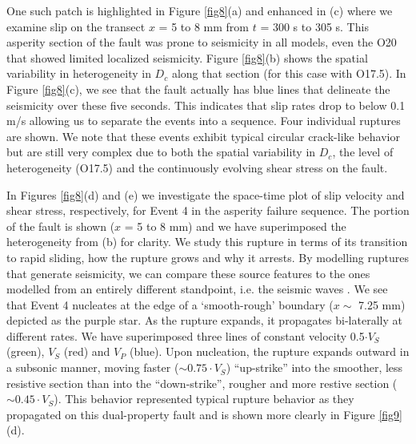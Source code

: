 \documentclass[draft]{agujournal2019}
\begin{document}
One such patch is highlighted in Figure \ref{fig8}(a) and enhanced in (c) where we examine slip on the transect $x$ = 5 to 8 mm from $t$ = 300 s to 305 s.  This asperity section of the fault was prone to seismicity in all models, even the O20 that showed limited localized seismicity. Figure \ref{fig8}(b) shows the spatial variability in heterogeneity in $D_{c}$ along that section (for this case with O17.5). In Figure \ref{fig8}(c), we see that the fault actually has blue lines that delineate the seismicity over these five seconds.  This indicates that slip rates drop to below 0.1 m/s allowing us to separate the events into a sequence.  Four individual ruptures are shown.  We note that these events exhibit typical circular crack-like behavior but are still very complex due to both the spatial variability in $D_{c}$, the level of heterogeneity (O17.5) and the continuously evolving shear stress on the fault.  

In Figures \ref{fig8}(d) and (e) we investigate the space-time plot of slip velocity and shear stress, respectively, for Event 4 in the asperity failure sequence. The portion of the fault is shown ($x$ = 5 to 8 mm) and we have superimposed the heterogeneity from (b) for clarity.  We study this rupture in terms of its transition to rapid sliding, how the rupture grows and why it arrests. By modelling ruptures that generate seismicity, we can compare these source features to the ones modelled from an entirely different standpoint, i.e. the seismic waves \cite{Selvadurai2019}. We see that Event 4 nucleates at the edge of a `smooth-rough' boundary ($x \sim$ 7.25 mm) depicted as the purple star. As the rupture expands, it propagates bi-laterally at different rates. We have superimposed three lines of constant velocity 0.5$\cdot V_{S}$ (green), $V_{S}$ (red) and $V_{P}$ (blue).  Upon nucleation, the rupture expands outward in a subsonic manner, moving faster ($\sim 0.75 \cdot V_{S}$) ``up-strike'' into the smoother, less resistive section than into the ``down-strike'', rougher and more restive section ($\sim 0.45\cdot V_{S}$). This behavior represented typical rupture behavior as they propagated on this dual-property fault and is shown more clearly in Figure \ref{fig9}(d).
\end{document}
